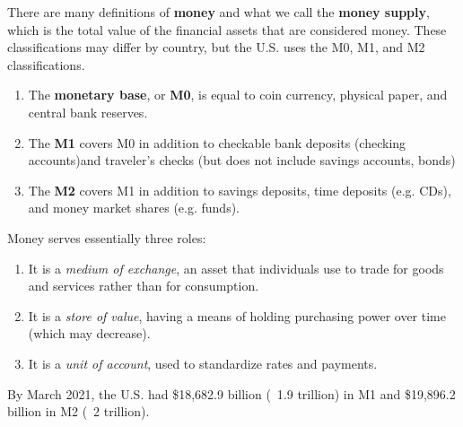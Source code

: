 \documentclass{article}
\begin{document}
      \begin{definition}
        There are many definitions of \textbf{money} and what we call the \textbf{money supply}, which is the total value of the financial assets that are considered money. These classifications may differ by country, but the U.S. uses the M0, M1, and M2 classifications.
        \begin{enumerate}
          \item The \textbf{monetary base}, or \textbf{M0}, is equal to coin currency, physical paper, and central bank reserves. 
          \item The \textbf{M1} covers M0 in addition to checkable bank deposits (checking accounts)and traveler's checks (but does not include savings accounts, bonds)
          \item The \textbf{M2} covers M1 in addition to savings deposits, time deposits (e.g. CDs), and money market shares (e.g. funds). 
        \end{enumerate}
        Money serves essentially three roles: 
        \begin{enumerate}
          \item It is a \textit{medium of exchange}, an asset that individuals use to trade for goods and services rather than for consumption. 
          \item It is a \textit{store of value}, having a means of holding purchasing power over time (which may decrease). 
          \item It is a \textit{unit of account}, used to standardize rates and payments. 
        \end{enumerate}
        By March 2021, the U.S. had \$18,682.9 billion (~1.9 trillion) in M1 and \$19,896.2 billion in M2 (~2 trillion). 
      \end{definition}
\end{document}
